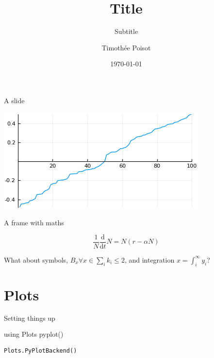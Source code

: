 \documentclass[11pt, compress, aspectratio=1610, serif]{beamer}
\title{Title}
\subtitle{Subtitle}
\date{\today}
\author{Timothée Poisot}
\institute{Université de Montréal}
\newenvironment{Shaded}{}{}
\newcommand{\NormalTok}[1]{{#1}}
\begin{document}
\maketitle

\begin{frame}{A slide}

\includegraphics[width=\textwidth]{figures/density.png}

\end{frame}

\begin{frame}{A frame with maths}

\[
\frac{1}{N}\frac{\text{d}}{\text{d}t}N = N\left(r-\alpha N\right)
\]

What about symbols, \(B_x \forall x \in \sum_i k_i \leq 2\), and
integration \(x = \int_i^\infty y_i\)?

\end{frame}

\section{Plots}\label{plots}

\begin{frame}[fragile]{Setting things up}

\begin{Shaded}
\begin{Highlighting}[]
\NormalTok{using Plots}
\NormalTok{pyplot()}
\end{Highlighting}
\end{Shaded}

\begin{verbatim}
Plots.PyPlotBackend()
\end{verbatim}

\end{frame}
\end{document}
